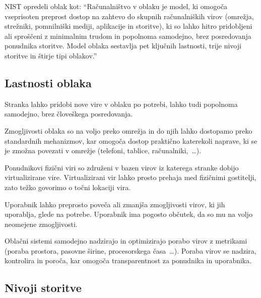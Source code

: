 \documentclass[12pt,a4paper,openany,tikz]{book}
\theoremstyle{plain}
\theoremstyle{definition}
\begin{document}
NIST opredeli oblak kot: ``Računalništvo v oblaku je model, ki omogoča vseprisoten preprost dostop na zahtevo do skupnih računalniških virov (omrežja, strežniki, pomnilniški mediji, aplikacije in storitve), ki so lahko hitro pridobljeni ali sproščeni z minimalnim trudom in popolnoma samodejno, brez posredovanja ponudnika storitve. Model oblaka sestavlja pet ključnih lastnosti, trije nivoji storitve in štirje tipi oblakov.''~\cite{mell2011nist}

\subsection*{Lastnosti oblaka}
\label{sub:Lastnosti oblaka}

\begin{description}[style=nextline]
   \item[Storitev na zahtevo] Stranka lahko pridobi nove vire v oblaku po potrebi, lahko tudi popolnoma samodejno, brez človeškega posredovanja.

   \item[Širok dostop preko omrežja] Zmogljivosti oblaka so na voljo preko omrežja in do njih lahko dostopamo preko standardnih mehanizmov, kar omogoča dostop praktično katerekoli naprave, ki se je zmožna povezati v omrežje (telefoni, tablice, računalniki,~\ldots).

   \item[Uporaba skupnih virov] Ponudnikovi fizični viri so združeni v bazen virov iz katerega stranke dobijo virtualizirane vire. Virtualizirani vir lahko prosto prehaja med fizičnimi gostitelji, zato težko govorimo o točni lokaciji vira.

   \item[Bliskovita prožnost] Uporabnik lahko preprosto poveča ali zmanjša zmogljivosti virov, ki jih uporablja, glede na potrebe. Uporabnik ima pogosto občutek, da so mu na voljo neomejene zmogljivosti.

   \item[Merjenje porabe in obračun glede na porabo virov]  Oblačni sistemi samodejno nadzirajo in optimizirajo porabo virov z metrikami (poraba prostora, pasovne širine, procesorskega časa~\ldots). Poraba virov se nadzira, kontrolira in poroča, kar omogoča transparentnost za ponudnika in uporabnika.
\end{description}

\subsection*{Nivoji storitve}
\label{sub:Nivoji storitve}
\end{document}
